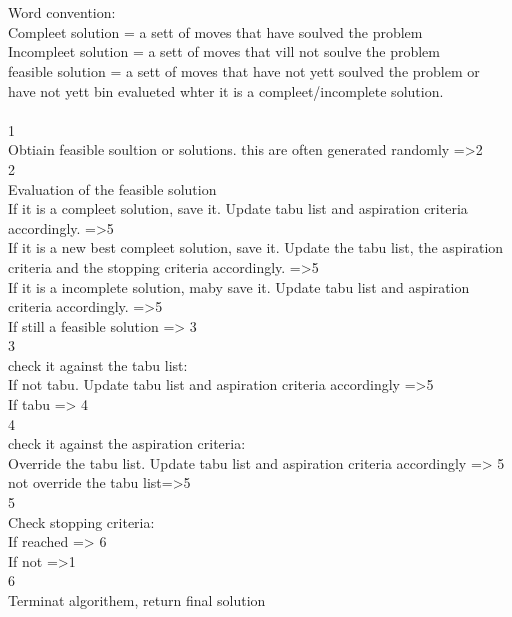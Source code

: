 \\
[skall laggas in I ordbeskrivnings kappitlet]\\
Word convention:\\ 
Compleet solution = a sett of moves that have soulved the problem\\
Incompleet solution = a sett of moves that vill not soulve the problem\\
feasible solution = a sett of moves that have not yett soulved the problem or have not yett bin evalueted whter it is a compleet/incomplete solution.\\
\\
1\\
Obtiain feasible soultion or solutions. this are often generated randomly =>2\\
2\\
Evaluation of the feasible solution\\
If it is a compleet solution, save it. Update tabu list and aspiration criteria accordingly. =>5\\
If it is a new best compleet solution, save it. Update the tabu list, the aspiration criteria and the stopping criteria accordingly. =>5\\
If it is a incomplete solution, maby save it. Update tabu list and aspiration criteria accordingly. =>5\\
If still a feasible solution => 3\\
3\\
check it against the tabu list:\\
If not tabu. Update tabu list and aspiration criteria accordingly =>5\\
If tabu => 4\\
4\\
check it against the aspiration criteria:\\
Override the tabu list. Update tabu list and aspiration criteria accordingly => 5\\
not override the tabu list=>5\\
5\\
Check stopping criteria:\\
If reached => 6\\
If not =>1\\
6\\
Terminat algorithem, return final solution\\
